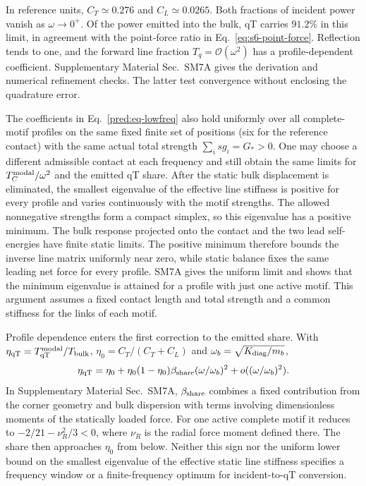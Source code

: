 \documentclass[10pt,aps,onecolumn,floatfix,notitlepage,nofootinbib,showkeys]{revtex4-2}
\newcommand{\order}{\mathcal O}
\newcommand{\qT}{\mathrm{qT}}
\begin{document}
In reference units, $C_T\simeq0.276$ and $C_L\simeq0.0265$. Both fractions of incident power vanish as $\omega\to0^+$. Of the power emitted into the bulk, qT carries $91.2\%$ in this limit, in agreement with the point-force ratio in Eq.~\eqref{eq:s6-point-force}. Reflection tends to one, and the forward line fraction $T_q=\order(\omega^2)$ has a profile-dependent coefficient. Supplementary Material Sec.~SM7A gives the derivation and numerical refinement checks. The latter test convergence without enclosing the quadrature error.

The coefficients in Eq.~\eqref{pred:eq-lowfreq} also hold uniformly over all complete-motif profiles on the same fixed finite set of positions (six for the reference contact) with the same actual total strength $\sum_i s g_i=G_*>0$. One may choose a different admissible contact at each frequency and still obtain the same limits for $T_C^{\rm modal}/\omega^2$ and the emitted qT share. After the static bulk displacement is eliminated, the smallest eigenvalue of the effective line stiffness is positive for every profile and varies continuously with the motif strengths. The allowed nonnegative strengths form a compact simplex, so this eigenvalue has a positive minimum. The bulk response projected onto the contact and the two lead self-energies have finite static limits. The positive minimum therefore bounds the inverse line matrix uniformly near zero, while static balance fixes the same leading net force for every profile. SM7A gives the uniform limit and shows that the minimum eigenvalue is attained for a profile with just one active motif. This argument assumes a fixed contact length and total strength and a common stiffness for the links of each motif.

Profile dependence enters the first correction to the emitted share. With $\eta_{\qT}=T_{\qT}^{\rm modal}/T_{\rm bulk}$, $\eta_0=C_T/(C_T+C_L)$ and $\omega_b=\sqrt{K_{\rm diag}/m_b}$,
\[
 \eta_{\qT}=\eta_0+\eta_0(1-\eta_0)\beta_{\rm share}
 (\omega/\omega_b)^2+o((\omega/\omega_b)^2).
\]
In Supplementary Material Sec.~SM7A, $\beta_{\rm share}$ combines a fixed contribution from the corner geometry and bulk dispersion with terms involving dimensionless moments of the statically loaded force. For one active complete motif it reduces to $-2/21-\nu_R^2/3<0$, where $\nu_R$ is the radial force moment defined there. The share then approaches $\eta_0$ from below. Neither this sign nor the uniform lower bound on the smallest eigenvalue of the effective static line stiffness specifies a frequency window or a finite-frequency optimum for incident-to-qT conversion.
\end{document}
